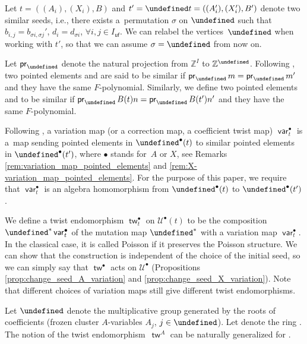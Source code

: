 \documentclass[10pt,a4paper]{amsart}
\newcommand{\kk}{\Bbbk}
\newcommand{\Z}{\mathbb{Z}}
\newcommand{\Q}{\mathbb{Q}}
\renewcommand{\tilde}[1]{\widetilde{#1}}
\newcommand{\opname}[1]{\operatorname{\mathsf{#1}}}
\newcommand{\pr}{\opname{pr}}
\newcommand{\cU}{{\mathcal U}}
\newcommand{\tw}{{\tilde{w}}}
\newcommand{\var}{\opname{var}}
\newcommand{\fv}{\opname{f}}
\newcommand{\ufv}{\opname{uf}}
\let\Iufv\undefined
\let\Ifv\undefined
\let\upClAlg\undefined
\let\LP\undefined
\let\fFac\undefined
\let\fFacRoot\undefined
\let\Id\undefined
\let\seq\undefined
\renewcommand{\tw}{\opname{tw}}
\newcommand{\Iufv}{I_{\ufv}}
\newcommand{\Ifv}{I_{\fv}}
\newcommand{\upClAlg}{\mathcal{U}^A}
\newcommand{\LP}{{\mathcal{LP}}}
\newcommand{\fFac}{\mathcal{Z}}
\newcommand{\fFacRoot}{\fFac^{\Q}}
\newcommand{\Id}{{\opname{Id}}}
\newcommand{\seq}{\boldsymbol{\mu}}%
\renewcommand{\tw}{\opname{tw}}
\numberwithin{equation}{section}
\begin{document}
Let $t=((A_{i}),(X_{i}),B)$ and $t'=\seq t=((A_{i}'),(X_{i}'),B')$
denote two similar seeds, i.e., there exists a~permutation $\sigma$
on $\Iufv$ such that $b_{i,j}=b_{\sigma i,\sigma j}'$, $d_{i}=d_{\sigma i}$,
$\forall i,j\in I_{\ufv}$. We can relabel the vertices~$\Iufv$ when
working with $t'$, so that we can assume $\sigma=\Id$ from now on.

Let $\pr_{\Iufv}$ denote the natural projection from $\Z^{I}$ to
$\Z^{\Iufv}$. Following \cite{Qin12,qin2017triangular}, two pointed
elements \smash{$S_{m}^{A}\in\LP^{A}(t)$} and \smash{$S_{m'}^{A}\in\LP^{A}(t')$}
are said to be similar if $\pr_{\Iufv}m=\pr_{\Iufv}m'$ and they have
the same $F$-polynomial. Similarly, we define two pointed elements
\smash{$S_{n}^{X}\in\LP^{X}(t)$} and \smash{${S_{n'}^{X}\in\LP^{X}(t')}$} to be similar
if $\pr_{\Iufv}B(t)n=\pr_{\Iufv}B(t')n'$ and they have the same $F$-polynomial.

Following \cite{Qin12,qin2017triangular}, a variation map (or a correction
map, a coefficient twist map) $\var_{t}^{\bullet}$ is a~map sending
pointed elements in $\LP^{\bullet}(t)$ to similar pointed elements
in $\LP^{\bullet}(t')$, where $\bullet$ stands for~$A$ or $X$, see Remarks \ref{rem:variation_map_pointed_elements} and \ref{rem:X-variation_map_pointed_elements}.
For the purpose of this paper, we require that $\var_{t}^{\bullet}$
is an algebra homomorphism from $\LP^{\bullet}(t)$ to $\LP^{\bullet}(t')$.

We define a twist endomorphism $\tw_{t}^{\bullet}$ on $\cU^{\bullet}(t)$
to be the composition $\seq^{*}\var_{t}^{\bullet}$ of the mutation
map $\seq^{*}$ with a variation map $\var_{t}^{\bullet}$. In the classical case, it is
called Poisson if it preserves the Poisson structure.
We can show that the construction is independent of the choice of
the initial seed, so we can simply say that $\tw^{\bullet}$ acts
on $\cU^{\bullet}$ (Propositions \ref{prop:change_seed_A_variation} and \ref{prop:change_seed_X_variation}). Note that different choices of variation maps still give different twist endomorphisms.

Let $\fFacRoot$ denote the multiplicative group generated by the
roots of coefficients (frozen cluster $A$-variables $A_{j}$, $j\in\Ifv$).
Let \smash{$\upClAlg_{\fFacRoot}$} denote the ring \smash{$\upClAlg\otimes \kk\big[\fFacRoot\big]$}.
The notion of the twist endomorphism~$\tw^{A}$ can be naturally generalized
for \smash{$\upClAlg_{\fFacRoot}$}.
\end{document}
